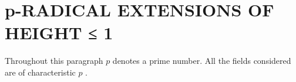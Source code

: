 \section{p-RADICAL EXTENSIONS OF HEIGHT ≤ 1}

Throughout this paragraph \(p\) denotes a prime number. All the fields considered are of characteristic \(p\) .


